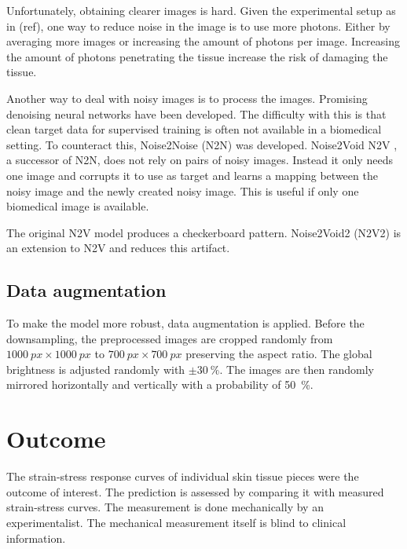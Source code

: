 Unfortunately, obtaining clearer images is hard.
Given the experimental setup as in (ref), one way to reduce noise in the image is to use more photons.
Either by averaging more images or increasing the amount of photons per image.
Increasing the amount of photons penetrating the tissue increase the risk of damaging the tissue.

Another way to deal with noisy images is to process the images.
Promising denoising neural networks have been developed.
The difficulty with this is that clean target data for supervised training is often not available in a biomedical setting.
To counteract this, Noise2Noise (N2N) \cite{Lehtinen2018} was developed.
Noise2Void N2V \cite{Krull2019}, a successor of N2N, does not rely on pairs of noisy images.
Instead it only needs one image and corrupts it to use as target and learns a mapping between the noisy image and the newly created noisy image.
This is useful if only one biomedical image is available.

The original N2V model produces a checkerboard pattern.
Noise2Void2 (N2V2) \cite{Hock2022} is an extension to N2V and reduces this artifact.

\subsection{Data augmentation}

To make the model more robust, data augmentation is applied.
Before the downsampling, the preprocessed images are cropped randomly from $\qty{1000}{px}\times \qty{1000}{px}$ to $\qty{700}{px}\times \qty{700}{px}$ preserving the aspect ratio.
The global brightness is adjusted randomly with $\pm \qty{30}{\percent}$.
The images are then randomly mirrored horizontally and vertically with a probability of \qty{50}{\percent}.

\section{Outcome}
The strain-stress response curves of individual skin tissue pieces were the outcome of interest.
The prediction is assessed by comparing it with measured strain-stress curves.
The measurement is done mechanically by an experimentalist.
The mechanical measurement itself is blind to clinical information.

